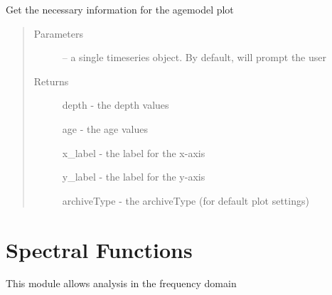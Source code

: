 \documentclass[letterpaper,10pt,english]{sphinxmanual}
\begin{document}
\begin{fulllineitems}
\label{\detokenize{SummaryPlots:pyleoclim.SummaryPlots.agemodelData}}
Get the necessary information for the agemodel plot
\begin{quote}\begin{description}
\item[{Parameters}] \leavevmode
{} -- a single timeseries object. By default, will
prompt the user

\item[{Returns}] \leavevmode

depth - the depth values

age - the age values

x\_label - the label for the x-axis

y\_label - the label for the y-axis

archiveType - the archiveType (for default plot settings)


\end{description}\end{quote}

\end{fulllineitems}



\chapter{Spectral Functions}
\label{\detokenize{Spectral::doc}}\label{\detokenize{Spectral:spectral-functions}}
This module allows analysis in the frequency domain
\end{document}
